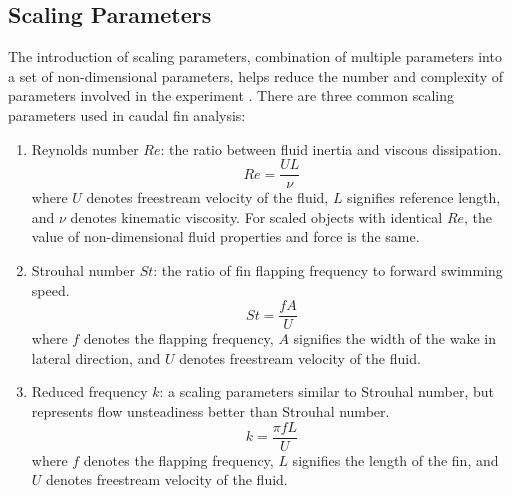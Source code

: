 \subsection{Scaling Parameters}
\label{sec:9}
The introduction of scaling parameters, combination of multiple parameters into a set of non-dimensional parameters, helps reduce the number and complexity of parameters involved in the experiment \citep{shyy}. There are three common scaling parameters used in caudal fin analysis:
\begin{enumerate}
    \item Reynolds number $Re$: the ratio between fluid inertia and viscous dissipation.
    \begin{equation}
        Re = \frac{U L}{\nu}
    \end{equation}
    where $U$ denotes freestream velocity of the fluid, $L$ signifies reference length, and $\nu$ denotes kinematic viscosity. For scaled objects with identical $Re$, the value of non-dimensional fluid properties and force is the same.
    \item Strouhal number $St$: the ratio of fin flapping frequency to forward swimming speed.
    \begin{equation}
        St = \frac{f A}{U}
    \end{equation}
    where $f$ denotes the flapping frequency, $A$ signifies the width of the wake in lateral direction, and $U$ denotes freestream velocity of the fluid.
    \item Reduced frequency $k$: a scaling parameters similar to Strouhal number, but represents flow unsteadiness better than Strouhal number.
    \begin{equation}
        k = \frac{\pi f L}{U}
    \end{equation}
    where $f$ denotes the flapping frequency, $L$ signifies the length of the fin, and $U$ denotes freestream velocity of the fluid.
\end{enumerate}
